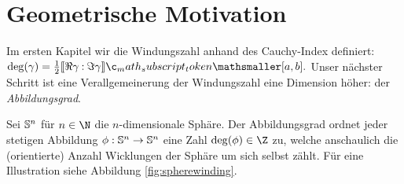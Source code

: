 \documentclass{mythesis}
\begin{document}
\section{Geometrische Motivation} \label{sec:ki_mot}


Im ersten Kapitel wir die Windungszahl anhand des Cauchy-Index definiert:
\begin{math}
    \deg(\gamma) = \frac{1}{2} \Index{[a,b]}{\Re \gamma}{\Im \gamma}.
\end{math}
Unser nächster Schritt ist eine Verallgemeinerung der Windungszahl eine Dimension höher: der \emph{Abbildungsgrad}.

Sei $\S^n$ für $n \in \N$ die $n$-dimensionale Sphäre.
Der Abbildungsgrad ordnet jeder stetigen Abbildung $\phi: \S^n \to \S^n$ eine Zahl $\deg(\phi) \in \Z$ zu, welche anschaulich die (orientierte) Anzahl Wicklungen der Sphäre um sich selbst zählt.
Für eine Illustration siehe Abbildung \ref{fig:spherewinding}.
\end{document}

